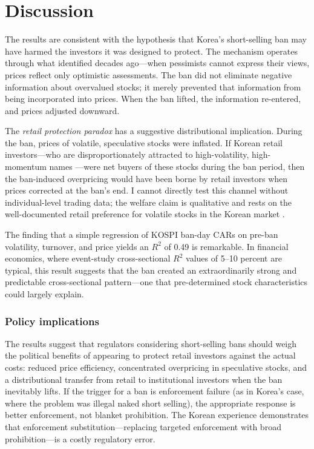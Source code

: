 \documentclass[12pt]{article}
\begin{document}
\section{Discussion}
\label{sec:discussion}

The results are consistent with the hypothesis that Korea's short-selling ban may have harmed the investors it was designed to protect. The mechanism operates through what \citet{miller1977risk} identified decades ago---when pessimists cannot express their views, prices reflect only optimistic assessments. The ban did not eliminate negative information about overvalued stocks; it merely prevented that information from being incorporated into prices. When the ban lifted, the information re-entered, and prices adjusted downward.

The \textit{retail protection paradox} has a suggestive distributional implication. During the ban, prices of volatile, speculative stocks were inflated. If Korean retail investors---who are disproportionately attracted to high-volatility, high-momentum names \citep{barber2008all, kelley2013retail}---were net buyers of these stocks during the ban period, then the ban-induced overpricing would have been borne by retail investors when prices corrected at the ban's end. I cannot directly test this channel without individual-level trading data; the welfare claim is qualitative and rests on the well-documented retail preference for volatile stocks in the Korean market \citep{kim2023korean}.

The finding that a simple regression of KOSPI ban-day CARs on pre-ban volatility, turnover, and price yields an $R^2$ of 0.49 is remarkable. In financial economics, where event-study cross-sectional $R^2$ values of 5--10 percent are typical, this result suggests that the ban created an extraordinarily strong and predictable cross-sectional pattern---one that pre-determined stock characteristics could largely explain.

\subsubsection*{Policy implications} The results suggest that regulators considering short-selling bans should weigh the political benefits of appearing to protect retail investors against the actual costs: reduced price efficiency, concentrated overpricing in speculative stocks, and a distributional transfer from retail to institutional investors when the ban inevitably lifts. If the trigger for a ban is enforcement failure (as in Korea's case, where the problem was illegal naked short selling), the appropriate response is better enforcement, not blanket prohibition. The Korean experience demonstrates that enforcement substitution---replacing targeted enforcement with broad prohibition---is a costly regulatory error.
\end{document}
